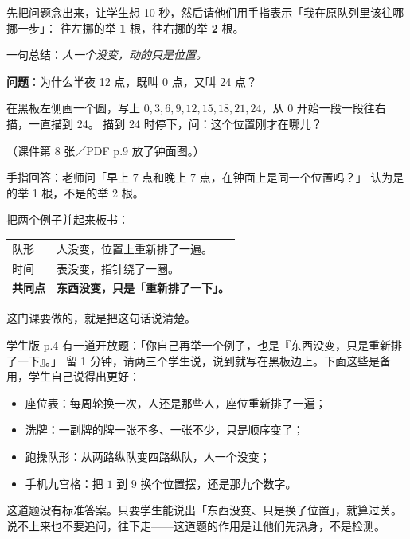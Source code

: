 先把问题念出来，让学生想 10 秒，然后请他们用手指表示「我在原队列里该往哪挪一步」：
往左挪的举 \textbf{1} 根，往右挪的举 \textbf{2} 根。

一句总结：\emph{人一个没变，动的只是位置。}

\begin{example}[例子二：半夜 12 点]
  \textbf{问题}：为什么半夜 12 点，既叫 0 点，又叫 24 点？
\end{example}

在黑板左侧画一个圆，写上 \(0,3,6,9,12,15,18,21,24\)，从 0 开始一段一段往右描，一直描到 24。
描到 24 时停下，问：这个位置刚才在哪儿？

（课件第 8 张／PDF p.9 放了钟面图。）

\noindent 手指回答：老师问「早上 7 点和晚上 7 点，在钟面上是同一个位置吗？」
认为是的举 1 根，不是的举 2 根。

\noindent 把两个例子并起来板书：

\begin{center}
\begin{tabular}{@{}ll@{}}
\toprule
队形 & 人没变，位置上重新排了一遍。 \\
时间 & 表没变，指针绕了一圈。 \\
\midrule
\textbf{共同点} & \textbf{东西没变，只是「重新排了一下」。} \\
\bottomrule
\end{tabular}
\end{center}

这门课要做的，就是把这句话说清楚。

\noindent 学生版 p.4 有一道开放题：「你自己再举一个例子，也是『东西没变，只是重新排了一下』。」
留 1 分钟，请两三个学生说，说到就写在黑板边上。下面这些是备用，学生自己说得出更好：

\begin{itemize}
  \item 座位表：每周轮换一次，人还是那些人，座位重新排了一遍；
  \item 洗牌：一副牌的牌一张不多、一张不少，只是顺序变了；
  \item 跑操队形：从两路纵队变四路纵队，人一个没变；
  \item 手机九宫格：把 \(1\) 到 \(9\) 换个位置摆，还是那九个数字。
\end{itemize}

\begin{zhu}
  这道题没有标准答案。只要学生能说出「东西没变、只是换了位置」，就算过关。
  说不上来也不要追问，往下走——这道题的作用是让他们先热身，不是检测。
\end{zhu}

